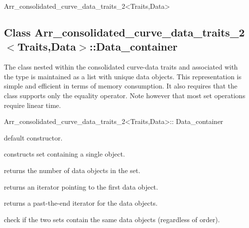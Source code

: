 \begin{ccRefClass}{Arr_consolidated_curve_data_traits_2<Traits,Data>}
\subsection*{Class Arr\_consolidated\_curve\_data\_traits\_2$<$Traits,Data$>$::Data\_container}

The  class nested within the consolidated 
curve-data traits and associated with the 
type is maintained as a list with unique data objects. This representation is
simple and efficient in terms of memory consumption. It also requires that
the  class supports only the equality operator. Note however that
most set operations require linear time.

\begin{ccClass}{Arr_consolidated_curve_data_traits_2<Traits,Data>::
                Data_container}


\ccCreation
%
  {default constructor.}

%
  {constructs set containing a single  object.}

\ccAccessFunctions

%
  {returns the number of data objects in the set.}

%
  {returns an iterator pointing to the first data object.}

%
  {returns a past-the-end iterator for the data objects.}



\ccPredicates
  {check if the two sets contain the same data objects (regardless of order).}



\end{ccClass}
\end{ccRefClass}
